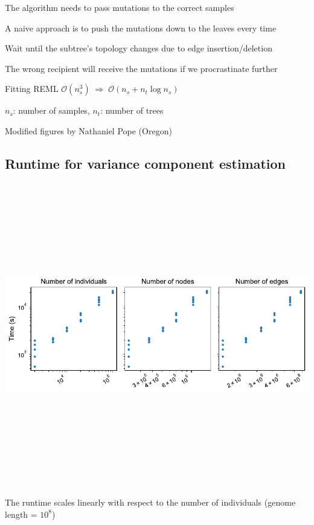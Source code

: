 \documentclass[
  letterpaper,
  DIV=11,
  numbers=noendperiod]{scrartcl}
\begin{document}
The algorithm needs to pass mutations to the correct samples

A naive approach is to push the mutations down to the leaves every time

Wait until the subtree's topology changes due to edge insertion/deletion

The wrong recipient will receive the mutations if we procrastinate
further

Fitting REML
\(\mathcal{O}(n_s^3) \; \Rightarrow \; \mathcal{O}(n_s+n_t\log n_s)\)

\(n_s\): number of samples, \(n_t\): number of trees

Modified figures by Nathaniel Pope (Oregon)

\subsection{Runtime for variance component
estimation}\label{runtime-for-variance-component-estimation}

\begin{center}
\includegraphics[width=\linewidth,height=5.20833in,keepaspectratio]{slides_files/mediabag/imgs/runtime.pdf}
\end{center}

The runtime scales linearly with respect to the number of individuals
(genome length = \(10^8\))
\end{document}
